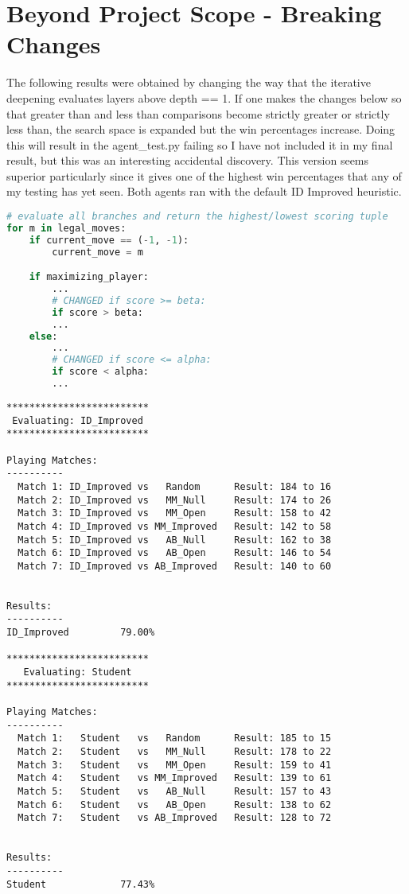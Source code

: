 \documentclass[10pt, a4paper]{article}
\begin{document}
\section{Beyond Project Scope - Breaking Changes}

The following results were obtained by changing the way that the iterative deepening
evaluates layers above depth == 1.  If one makes the changes below so that greater than and
less than comparisons become strictly greater or strictly less than, the search space is
expanded but the win percentages increase.  Doing this will result in the agent\_test.py
failing so I have not included it in my final result, but this was an interesting accidental
discovery.  This version seems superior particularly since it gives one of the highest win percentages
that any of my testing has yet seen.  Both agents ran with the default ID Improved heuristic.

\begin{lstlisting}[language=Python]
# evaluate all branches and return the highest/lowest scoring tuple
for m in legal_moves:
	if current_move == (-1, -1):
		current_move = m

	if maximizing_player:
		...
		# CHANGED if score >= beta:
		if score > beta:
		...
	else:	
		...
		# CHANGED if score <= alpha:
		if score < alpha:
		...
\end{lstlisting}

\begin{verbatim}
*************************
 Evaluating: ID_Improved 
*************************

Playing Matches:
----------
  Match 1: ID_Improved vs   Random    	Result: 184 to 16
  Match 2: ID_Improved vs   MM_Null   	Result: 174 to 26
  Match 3: ID_Improved vs   MM_Open   	Result: 158 to 42
  Match 4: ID_Improved vs MM_Improved 	Result: 142 to 58
  Match 5: ID_Improved vs   AB_Null   	Result: 162 to 38
  Match 6: ID_Improved vs   AB_Open   	Result: 146 to 54
  Match 7: ID_Improved vs AB_Improved 	Result: 140 to 60


Results:
----------
ID_Improved         79.00%

*************************
   Evaluating: Student   
*************************

Playing Matches:
----------
  Match 1:   Student   vs   Random    	Result: 185 to 15
  Match 2:   Student   vs   MM_Null   	Result: 178 to 22
  Match 3:   Student   vs   MM_Open   	Result: 159 to 41
  Match 4:   Student   vs MM_Improved 	Result: 139 to 61
  Match 5:   Student   vs   AB_Null   	Result: 157 to 43
  Match 6:   Student   vs   AB_Open   	Result: 138 to 62
  Match 7:   Student   vs AB_Improved 	Result: 128 to 72


Results:
----------
Student             77.43%
\end{verbatim}
\end{document}
